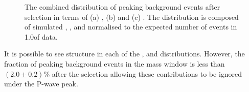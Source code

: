 \begin{figure}
\centering
{}
\caption[ The combined distribution of peaking background events after selection in terms of (a) \mkpimm, (b) \mkpi and (c) \ctk.   ]
{ The combined distribution of peaking background events after selection in terms of (a) \mkpimm, (b) \mkpi and (c) \ctk.
The distribution is composed of simulated \BdToKstmm, \BsToPhimm, \BuToKmm and \LbToLmm normalised to
the expected number of events in 1.0\invfb of data. %
~\label{fig:swave:peaking:backgrounds} }
\end{figure}
It is possible to see structure in each of the \mkpill, \mkpi and \ctk distributions.
However, the fraction of peaking background events in the \kpill mass window is less than $(2.0\pm0.2)\%$ after the selection allowing these contributions to be ignored under the P-wave peak.

